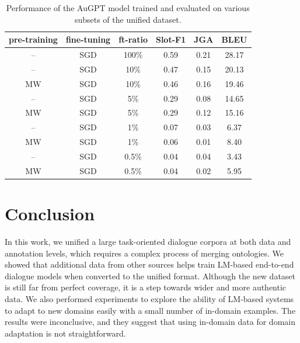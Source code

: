 \begin{table}[tp]
    \centering \small
    \begin{tabular}{cccccc}
      \toprule
       pre-training & fine-tuning & ft-ratio & \textbf{Slot-F1} & \textbf{JGA} & \textbf{BLEU} \\
        \midrule
       -- & SGD & 100\% & 0.59 & 0.21 & 28.17 \\
       -- & SGD & 10\% & 0.47 & 0.15 & 20.13 \\
       MW & SGD & 10\% & 0.46 & 0.16 & 19.46 \\
       -- & SGD & 5\% & 0.29 & 0.08 & 14.65 \\
       MW & SGD & 5\% & 0.29 & 0.12 & 15.16 \\
       -- & SGD & 1\% & 0.07 & 0.03 & 6.37\\
       MW & SGD & 1\% & 0.06 & 0.01 & 8.40 \\
       -- & SGD & 0.5\% & 0.04 & 0.04 & 3.43 \\
       MW & SGD & 0.5\% & 0.04 & 0.02 & 5.95 \\
       \midrule
      \bottomrule
  \end{tabular}
  \caption{Performance of the AuGPT model trained and evaluated on various subsets of the unified dataset.}
  \label{tab:exp-results-seed}
\end{table}

\section{Conclusion}
In this work, we unified a large task-oriented dialogue corpora at both data and annotation levels, which requires a complex process of merging ontologies. 
We showed that additional data from other sources helps train LM-based end-to-end dialogue models when converted to the unified format.
Although the new dataset is still far from perfect coverage, it is a step towards wider and more authentic data.
We also performed experiments to explore the ability of LM-based systems to adapt to new domains easily with a small number of in-domain examples.
The results were inconclusive, and they suggest that using in-domain data for domain adaptation is not straightforward.